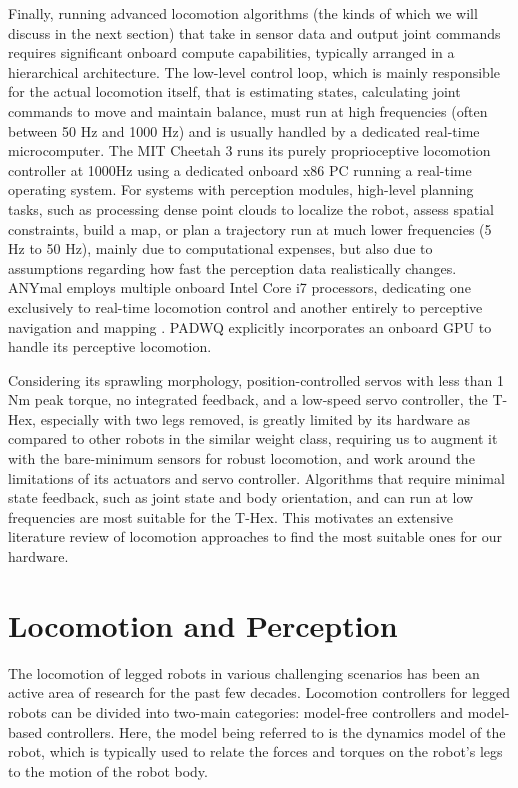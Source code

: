 Finally, running advanced locomotion algorithms (the kinds of which we will discuss in the next section) that take in sensor data and output joint commands requires significant onboard compute capabilities, typically arranged in a hierarchical architecture. The low-level control loop, which is mainly responsible for the actual locomotion itself, that is estimating states, calculating joint commands to move and maintain balance, must run at high frequencies (often between 50 Hz and 1000 Hz) and is usually handled by a dedicated real-time microcomputer. The MIT Cheetah 3 \cite{bledtMITCheetah32018} runs its purely proprioceptive locomotion controller at 1000Hz using a dedicated onboard x86 PC running a real-time operating system. For systems with perception modules, high-level planning tasks, such as processing dense point clouds to localize the robot, assess spatial constraints, build a map, or plan a trajectory run at much lower frequencies (5 Hz to 50 Hz), mainly due to computational expenses, but also due to assumptions regarding how fast the perception data realistically changes. ANYmal \cite{hutterANYmalHighlyMobile2016} employs multiple onboard Intel Core i7 processors, dedicating one exclusively to real-time locomotion control and another entirely to perceptive navigation and mapping \cite{hoellerANYmalParkourLearning2023}. PADWQ \cite{kimPADWQDesignControl2021} explicitly incorporates an onboard GPU to handle its perceptive locomotion.

Considering its sprawling morphology, position-controlled servos with less than 1 Nm peak torque, no integrated feedback, and a low-speed servo controller, the T-Hex, especially with two legs removed, is greatly limited by its hardware as compared to other robots in the similar weight class, requiring us to augment it with the bare-minimum sensors for robust locomotion, and work around the limitations of its actuators and servo controller. Algorithms that require minimal state feedback, such as joint state and body orientation, and can run at low frequencies are most suitable for the T-Hex. This motivates an extensive literature review of locomotion approaches to find the most suitable ones for our hardware.

\section{Locomotion and Perception}

The locomotion of legged robots in various challenging scenarios has been an active area of research for the past few decades. Locomotion controllers for legged robots can be divided into two-main categories: model-free controllers and model-based controllers. Here, the model being referred to is the dynamics model of the robot, which is typically used to relate the forces and torques on the robot's legs to the motion of the robot body\cite{bledtMITCheetah32018, dicarloDynamicLocomotionMIT2018}. 

